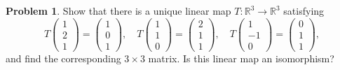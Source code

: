\documentclass[11pt,oneside]{amsart}
\theoremstyle{definition}
\newtheorem{problem}{Problem}
\newcommand{\bR}{\mathbb{R}}
\newcommand*\dcolvec[1]{\begin{pmatrix}#1\end{pmatrix}}
\begin{document}
    \begin{problem}
        Show that there is a unique linear map $T\colon\bR^3\to\bR^3$ satisfying
        \[T\dcolvec{1\\2\\1}=\dcolvec{1\\0\\1},\quad T\dcolvec{1\\1\\0}=\dcolvec{2\\1\\1},\quad T\dcolvec{1\\-1\\0}=\dcolvec{0\\1\\1},\]
        and find the corresponding $3\times 3$ matrix. Is this linear map an isomorphism?
    \end{problem}
\end{document}
